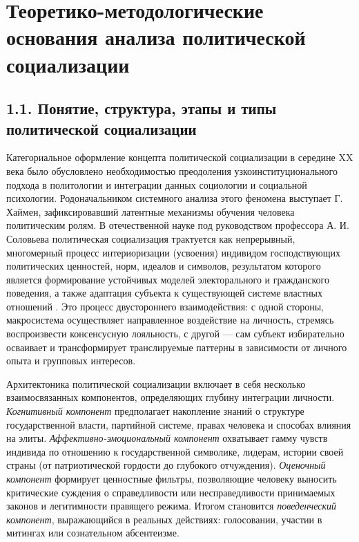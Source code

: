 \section{Теоретико-методологические основания анализа политической социализации}

\subsection{1.1. Понятие, структура, этапы и типы политической социализации}

Категориальное оформление концепта политической социализации в середине XX века было обусловлено необходимостью преодоления узкоинституционального подхода в политологии и интеграции данных социологии и социальной психологии. Родоначальником системного анализа этого феномена выступает Г. Хаймен, зафиксировавший латентные механизмы обучения человека политическим ролям. В отечественной науке под руководством профессора А. И. Соловьева политическая социализация трактуется как непрерывный, многомерный процесс интериоризации (усвоения) индивидом господствующих политических ценностей, норм, идеалов и символов, результатом которого является формирование устойчивых моделей электорального и гражданского поведения, а также адаптация субъекта к существующей системе властных отношений \cite{Solovyev}. Это процесс двустороннего взаимодействия: с одной стороны, макросистема осуществляет направленное воздействие на личность, стремясь воспроизвести консенсусную лояльность, с другой --- сам субъект избирательно осваивает и трансформирует транслируемые паттерны в зависимости от личного опыта и групповых интересов.

Архитектоника политической социализации включает в себя несколько взаимосвязанных компонентов, определяющих глубину интеграции личности. \textit{Когнитивный компонент} предполагает накопление знаний о структуре государственной власти, партийной системе, правах человека и способах влияния на элиты. \textit{Аффективно-эмоциональный компонент} охватывает гамму чувств индивида по отношению к государственной символике, лидерам, истории своей страны (от патриотической гордости до глубокого отчуждения). \textit{Оценочный компонент} формирует ценностные фильтры, позволяющие человеку выносить критические суждения о справедливости или несправедливости принимаемых законов и легитимности правящего режима. Итогом становится \textit{поведенческий компонент}, выражающийся в реальных действиях: голосовании, участии в митингах или сознательном абсентеизме.

